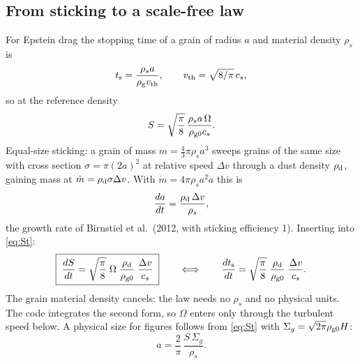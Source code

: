 \documentclass[11pt]{article}
\newcommand{\St}{S}
\newcommand{\ts}{t_{\rm s}}
\newcommand{\rhod}{\rho_{\rm d}}
\newcommand{\rhog}{\rho_{\rm g}}
\begin{document}
\subsection{From sticking to a scale-free law}
For Epstein drag the stopping time of a grain of radius $a$ and material density
$\rho_s$ is
\begin{equation}
  \ts = \frac{\rho_s a}{\rhog v_{\rm th}},\qquad v_{\rm th}=\sqrt{8/\pi}\,c_s ,
\end{equation}
so at the reference density
\begin{equation}
  \St = \sqrt{\frac{\pi}{8}}\,\frac{\rho_s a\,\Omega}{\rho_{\rm g0} c_s}. \label{eq:St}
\end{equation}
Equal-size sticking: a grain of mass $m=\frac43\pi\rho_s a^3$ sweeps grains of the same
size with cross section $\sigma=\pi(2a)^2$ at relative speed $\Delta v$ through a dust
density $\rhod$, gaining mass at $\dot m=\rhod\sigma\Delta v$. With
$\dot m=4\pi\rho_s a^2\dot a$ this is
\begin{equation}
  \frac{da}{dt} = \frac{\rhod\,\Delta v}{\rho_s},
\end{equation}
the growth rate of Birnstiel et al.\ (2012, with sticking efficiency 1). Inserting into
\eqref{eq:St}:
\begin{equation}
  \boxed{\;\frac{d\St}{dt} = \sqrt{\frac{\pi}{8}}\;\Omega\;\frac{\rhod}{\rho_{\rm g0}}\;
  \frac{\Delta v}{c_s}\;}
  \qquad\Longleftrightarrow\qquad
  \frac{d\ts}{dt} = \sqrt{\frac{\pi}{8}}\;\frac{\rhod}{\rho_{\rm g0}}\;\frac{\Delta v}{c_s}.
  \label{eq:law}
\end{equation}
The grain material density cancels: the law needs no $\rho_s$ and no physical units.
The code integrates the second form, so $\Omega$ enters only through the turbulent
speed below. A physical size for figures follows from \eqref{eq:St} with
$\Sigma_g=\sqrt{2\pi}\rho_{\rm g0}H$:
\begin{equation}
  a = \frac{2}{\pi}\,\frac{\St\,\Sigma_g}{\rho_s}.
\end{equation}
\end{document}
